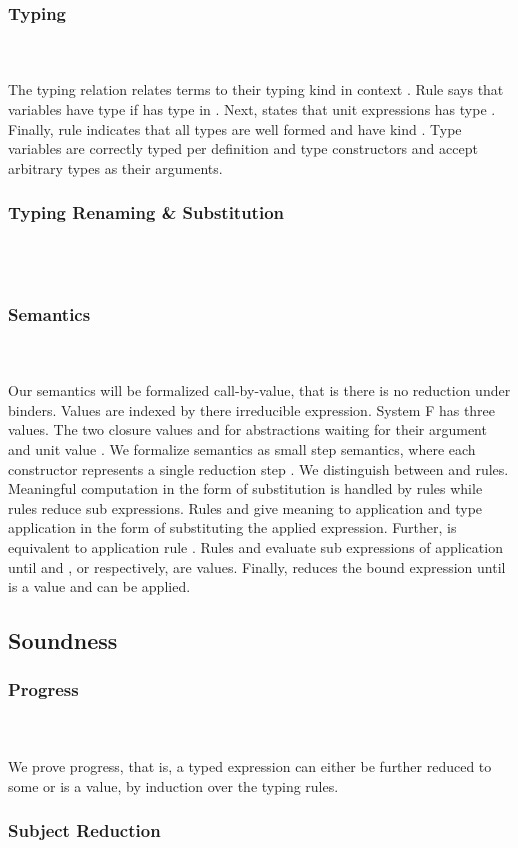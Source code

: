 \subsubsection{Typing}\hfill\\\\
The typing relation    \Data{:}  relates terms  to their typing kind  in context .
\FTyping
Rule  says that variables   have type  if  has type  in . Next,  states that unit expressions  has type . 
Finally, rule  indicates that all types  are well formed and have kind . Type variables are correctly typed per definition and type constructors  and  accept arbitrary types as their arguments.

\subsubsection{Typing Renaming \& Substitution}\hfill\\\\
\FRenTyping
\FSubTyping

\subsubsection{Semantics}\hfill\\\\
Our semantics will be formalized call-by-value, that is there is no reduction under binders. Values are indexed by there irreducible expression.
\FVal
System F has three values. The two closure values  and  for abstractions waiting for their argument and unit value .
We formalize semantics as small step semantics, where each constructor represents a single reduction step   .
We distinguish between  and  rules. Meaningful computation in the form of substitution is handled by  rules while  rules reduce sub expressions.
\FSemantics
Rules  and  give meaning to application and type application in the form of substituting the applied expression. Further,  is equivalent to application rule . Rules  and  evaluate sub expressions of application until  and , or  respectively, are values. Finally,  reduces the bound expression  until  is a value and  can be applied.    
\subsection{Soundness}

\subsubsection{Progress}\hfill\\\\
We prove progress, that is, a typed expression  can either be further reduced to some  or  is a value, by induction over the typing rules. 
\FProgress

\subsubsection{Subject Reduction}\hfill\\\\
\FSubjectReduction
